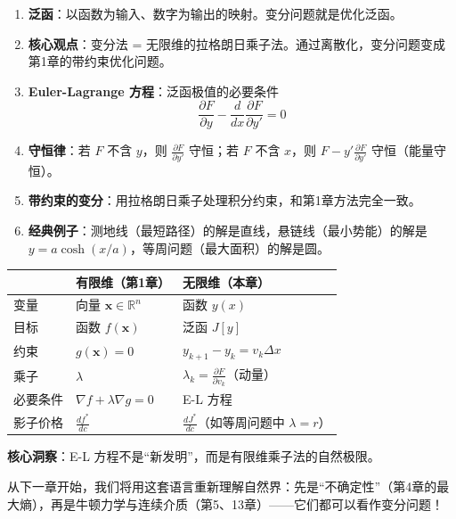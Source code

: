 \begin{enumerate}
    \item \textbf{泛函}：以函数为输入、数字为输出的映射。变分问题就是优化泛函。
    
    \item \textbf{核心观点}：变分法 = 无限维的拉格朗日乘子法。通过离散化，变分问题变成第1章的带约束优化问题。
    
    \item \textbf{Euler-Lagrange 方程}：泛函极值的必要条件
    \[
    \frac{\partial F}{\partial y} - \frac{d}{dx}\frac{\partial F}{\partial y'} = 0
    \]
    
    \item \textbf{守恒律}：若 $F$ 不含 $y$，则 $\frac{\partial F}{\partial y'}$ 守恒；若 $F$ 不含 $x$，则 $F - y'\frac{\partial F}{\partial y'}$ 守恒（能量守恒）。

    \item \textbf{带约束的变分}：用拉格朗日乘子处理积分约束，和第1章方法完全一致。

    \item \textbf{经典例子}：测地线（最短路径）的解是直线，悬链线（最小势能）的解是 $y = a\cosh(x/a)$，等周问题（最大面积）的解是圆。
\end{enumerate}

\begin{unification}[title=统一视角]
\begin{center}
\renewcommand{\arraystretch}{1.4}
\begin{tabular}{lll}
\toprule
& \textbf{有限维（第1章）} & \textbf{无限维（本章）} \\
\midrule
变量 & 向量 $\mathbf{x} \in \mathbb{R}^n$ & 函数 $y(x)$ \\
目标 & 函数 $f(\mathbf{x})$ & 泛函 $J[y]$ \\
约束 & $g(\mathbf{x}) = 0$ & $y_{k+1} - y_k = v_k \Delta x$ \\
乘子 & $\lambda$ & $\lambda_k = \frac{\partial F}{\partial v_k}$（动量） \\
必要条件 & $\nabla f + \lambda \nabla g = 0$ & E-L 方程 \\
影子价格 & $\frac{df^*}{dc}$ & $\frac{dJ^*}{dc}$（如等周问题中 $\lambda = r$） \\
\bottomrule
\end{tabular}
\end{center}

\textbf{核心洞察}：E-L 方程不是“新发明”，而是有限维乘子法的自然极限。

从下一章开始，我们将用这套语言重新理解自然界：先是“不确定性”（第4章的最大熵），再是牛顿力学与连续介质（第5、13章）——它们都可以看作变分问题！
\end{unification}

